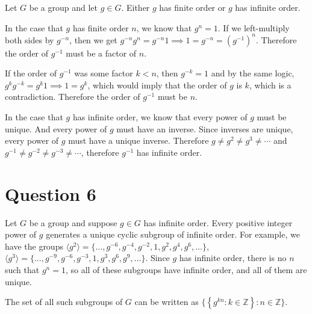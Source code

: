 \documentclass[a4paper]{article}
\begin{document}
Let $G$ be a group and let $g \in G$. Either $g$ has finite order or $g$ has infinite order.

In the case that $g$ has finite order $n$, we know that $g^n = 1$. If we left-multiply both sides by $g^{-n}$, then we get $g^{-n} g^n = g^{-n} 1 \implies 1 = g^{-n} = \left(g^{-1}\right)^n$. Therefore the order of $g^{-1}$ must be a factor of $n$.

If the order of $g^{-1}$ was some factor $k < n$, then $g^{-k} = 1$ and by the same logic, $g^k g^{-k} = g^k 1 \implies 1 = g^k$, which would imply that the order of $g$ is $k$, which is a contradiction. Therefore the order of $g^{-1}$ must be $n$.

In the case that $g$ has infinite order, we know that every power of $g$ must be unique. And every power of $g$ must have an inverse. Since inverses are unique, every power of $g$ must have a unique inverse. Therefore $g \ne g^2 \ne g^3 \ne \cdots$ and $g^{-1} \ne g^{-2} \ne g^{-3} \ne \cdots$, therefore $g^{-1}$ has infinite order.


\section*{Question 6}

Let $G$ be a group and suppose $g \in G$ has infinite order. Every positive integer power of $g$ generates a unique cyclic subgroup of infinite order. For example, we have the groups $\langle g^2 \rangle = \{\ldots, g^{-6}, g^{-4}, g^{-2}, 1, g^2, g^4, g^6, \ldots\}$, $\langle g^3 \rangle = \{\ldots, g^{-9}, g^{-6}, g^{-3}, 1, g^3, g^6, g^9, \ldots\}$. Since $g$ has infinite order, there is no $n$ such that $g^n = 1$, so all of these subgroups have infinite order, and all of them are unique.

The set of all such subgroups of $G$ can be written as $\Big\{ \left\{g^{kn} : k \in \mathbb Z\right\} : n \in \mathbb Z \Big\}$.
\end{document}
